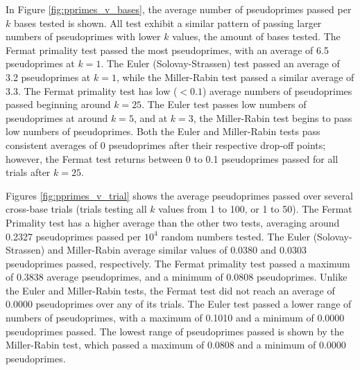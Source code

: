 \documentclass{article}
\begin{document}
In Figure \ref{fig:pprimes_v_bases}, the average number of pseudoprimes passed per $k$ bases tested is shown. All test exhibit a similar pattern of passing larger numbers of pseudoprimes with lower $k$ values, the amount of bases tested. The Fermat primality test passed the most pseudoprimes, with an average of 6.5 pseudoprimes at $k = 1$. The Euler (Solovay-Strassen) test passed an average of 3.2 pseudoprimes at $k = 1$, while the Miller-Rabin test passed a similar average of 3.3. The Fermat primality test has low ($<0.1$) average numbers of pseudoprimes passed beginning around $k = 25$. The Euler test passes low numbers of pseudoprimes at around $k = 5$, and at $k = 3$, the Miller-Rabin test begins to pass low numbers of pseudoprimes. Both the Euler and Miller-Rabin tests pass consistent averages of 0 pseudoprimes after their respective drop-off points; however, the Fermat test returns between 0 to 0.1 pseudoprimes passed for all trials after $k = 25$.

Figures \ref{fig:pprimes_v_trial} shows the average pseudoprimes passed over several cross-base trials (trials testing all $k$ values from 1 to 100, or 1 to 50). The Fermat Primality test has a higher average than the other two tests, averaging around 0.2327 pseudoprimes passed per $10^4$ random numbers tested. The Euler (Solovay-Strassen) and Miller-Rabin average similar values of 0.0380 and 0.0303 pseudoprimes passed, respectively. The Fermat primality test passed a maximum of 0.3838 average pseudoprimes, and a minimum of 0.0808 pseudoprimes. Unlike the Euler and Miller-Rabin tests, the Fermat test did not reach an average of 0.0000 pseudoprimes over any of its trials. The Euler test passed a lower range of numbers of pseudoprimes, with a maximum of 0.1010 and a minimum of 0.0000 pseudoprimes passed. The lowest range of pseudoprimes passed is shown by the Miller-Rabin test, which passed a maximum of 0.0808 and a minimum of 0.0000 pseudoprimes.
\end{document}
